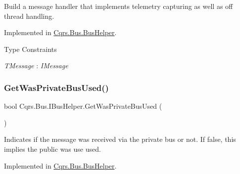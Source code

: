 Build a message handler that implements telemetry capturing as well as off thread handling. 



Implemented in \hyperlink{classCqrs_1_1Bus_1_1BusHelper_a7edd5b2ac0d46ce225e592f857f6d525_a7edd5b2ac0d46ce225e592f857f6d525}{Cqrs.\+Bus.\+Bus\+Helper}.

\begin{Desc}
\item[Type Constraints]\begin{description}
\item[{\em T\+Message} : {\em I\+Message}]\end{description}
\end{Desc}
\mbox{\label{interfaceCqrs_1_1Bus_1_1IBusHelper_a6e3d49a9367f3709d216f02be0277eea_a6e3d49a9367f3709d216f02be0277eea}} 
\subsubsection{\texorpdfstring{Get\+Was\+Private\+Bus\+Used()}{GetWasPrivateBusUsed()}}
{\footnotesize\ttfamily bool Cqrs.\+Bus.\+I\+Bus\+Helper.\+Get\+Was\+Private\+Bus\+Used (\begin{DoxyParamCaption}{ }\end{DoxyParamCaption})}



Indicates if the message was received via the private bus or not. If false, this implies the public was use used. 



Implemented in \hyperlink{classCqrs_1_1Bus_1_1BusHelper_a68714a43256976db7d780b126ca3f8bd_a68714a43256976db7d780b126ca3f8bd}{Cqrs.\+Bus.\+Bus\+Helper}.

\mbox{\label{interfaceCqrs_1_1Bus_1_1IBusHelper_acddf7635d6de08e3b09d552361fe4fda_acddf7635d6de08e3b09d552361fe4fda}} 
